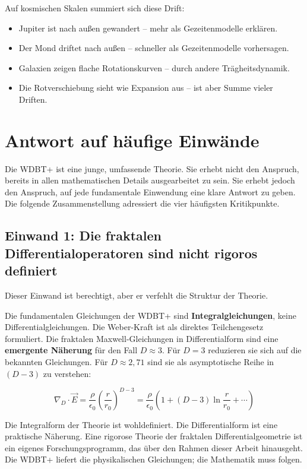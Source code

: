 \documentclass[12pt,a4paper]{article}
\begin{document}
Auf kosmischen Skalen summiert sich diese Drift:
\begin{itemize}
\item Jupiter ist nach außen gewandert -- mehr als Gezeitenmodelle erklären.
\item Der Mond driftet nach außen -- schneller als Gezeitenmodelle vorhersagen.
\item Galaxien zeigen flache Rotationskurven -- durch andere Trägheitsdynamik.
\item Die Rotverschiebung sieht wie Expansion aus -- ist aber Summe vieler Driften.
\end{itemize}

\section{Antwort auf häufige Einwände}

Die WDBT+ ist eine junge, umfassende Theorie. Sie erhebt nicht den Anspruch, bereits in allen mathematischen Details ausgearbeitet zu sein. Sie erhebt jedoch den Anspruch, auf jede fundamentale Einwendung eine klare Antwort zu geben. Die folgende Zusammenstellung adressiert die vier häufigsten Kritikpunkte.

\subsection{Einwand 1: Die fraktalen Differentialoperatoren sind nicht rigoros definiert}

Dieser Einwand ist berechtigt, aber er verfehlt die Struktur der Theorie.

Die fundamentalen Gleichungen der WDBT+ sind \textbf{Integralgleichungen}, keine Differentialgleichungen. Die Weber-Kraft ist als direktes Teilchengesetz formuliert. Die fraktalen Maxwell-Gleichungen in Differentialform sind eine \textbf{emergente Näherung} für den Fall $D \approx 3$. Für $D = 3$ reduzieren sie sich auf die bekannten Gleichungen. Für $D \approx 2,71$ sind sie als asymptotische Reihe in $(D-3)$ zu verstehen:

\begin{equation}
\nabla_D \cdot \vec{E} = \frac{\rho}{\epsilon_0} \left( \frac{r}{r_0} \right)^{D-3} = \frac{\rho}{\epsilon_0} \left(1 + (D-3)\ln\frac{r}{r_0} + \cdots \right)
\end{equation}

Die Integralform der Theorie ist wohldefiniert. Die Differentialform ist eine praktische Näherung. Eine rigorose Theorie der fraktalen Differentialgeometrie ist ein eigenes Forschungsprogramm, das über den Rahmen dieser Arbeit hinausgeht. Die WDBT+ liefert die physikalischen Gleichungen; die Mathematik muss folgen.
\end{document}
